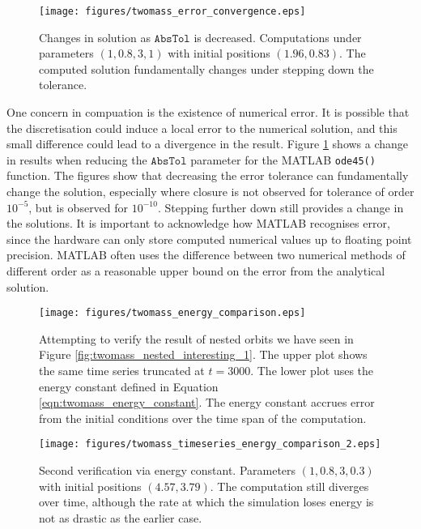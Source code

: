 \documentclass{article}
\begin{document}
\begin{figure}
    \centering
    \texttt{[image: figures/twomass\_error\_convergence.eps]}
    \caption{
        Changes in solution as \(\mathtt{AbsTol}\) is decreased.
        Computations under parameters \((1, 0.8, 3, 1)\) with initial positions \((1.96, 0.83)\).
        The computed solution fundamentally changes under stepping down the tolerance.   
    }
    \label{fig:twomass_stepping_tolerance}
\end{figure}

One concern in compuation is the existence of numerical error.
It is possible that the discretisation could induce a local error to the numerical solution,
and this small difference could lead to a divergence in the result.
Figure \ref{fig:twomass_stepping_tolerance} shows a change in results when reducing the $\mathtt{AbsTol}$ parameter for the MATLAB \texttt{ode45()} function.
The figures show that decreasing the error tolerance can fundamentally change the solution,
especially where closure is not observed for tolerance of order $10^{-5}$,
but is observed for $10^{-10}$.
Stepping further down still provides a change in the solutions.
It is important to acknowledge how MATLAB recognises error,
since the hardware can only store computed numerical values up to floating point precision.
MATLAB often uses the difference between two numerical methods of different order as a reasonable upper bound on the error from the analytical solution.

\begin{figure}
    \centering
    \texttt{[image: figures/twomass\_energy\_comparison.eps]}
    \caption{
        Attempting to verify the result of nested orbits we have seen in Figure \ref{fig:twomass_nested_interesting_1}.
        The upper plot shows the same time series truncated at $t=3000$.
        The lower plot uses the energy constant defined in Equation \ref{eqn:twomass_energy_constant}.
        The energy constant accrues error from the initial conditions over the time span of the computation.
    }
    \label{fig:twomass_energy_madplot}
\end{figure}

\begin{figure}
    \centering
    \texttt{[image: figures/twomass\_timeseries\_energy\_comparison\_2.eps]}
    \caption{
        Second verification via energy constant.
        Parameters \((1, 0.8, 3, 0.3)\) with initial positions \((4.57, 3.79)\).
        The computation still diverges over time,
        although the rate at which the simulation loses energy is not as drastic as the earlier case.
    }
    \label{fig:twomass_energy_2}
\end{figure}
\end{document}
